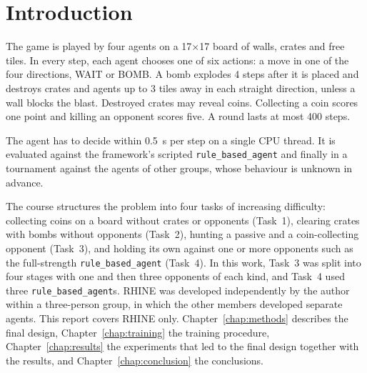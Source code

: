 \documentclass[11pt,a4paper]{report}
\begin{document}
	\clearpage
	
	\tableofcontents
	
	\clearpage
	
	\graphicspath{{figures/}}
	
	
	\chapter{Introduction}
	\label{chap:introduction}
	
	The game is played by four agents on a 17$\times$17 board of walls, crates and free tiles. In every step, each agent chooses one of six actions: a move in one of the four directions, WAIT or BOMB. A bomb explodes 4 steps after it is placed and destroys crates and agents up to 3 tiles away in each straight direction, unless a wall blocks the blast. Destroyed crates may reveal coins. Collecting a coin scores one point and killing an opponent scores five. A round lasts at most 400 steps.
	
	The agent has to decide within 0.5~s per step on a single CPU thread. It is evaluated against the framework's scripted \texttt{rule\_based\_agent} and finally in a tournament against the agents of other groups, whose behaviour is unknown in advance.
	
	The course structures the problem into four tasks of increasing difficulty: collecting coins on a board without crates or opponents (Task~1), clearing crates with bombs without opponents (Task~2), hunting a passive and a coin-collecting opponent (Task~3), and holding its own against one or more opponents such as the full-strength \texttt{rule\_based\_agent} (Task~4). In this work, Task~3 was split into four stages with one and then three opponents of each kind, and Task~4 used three \texttt{rule\_based\_agent}s. RHINE was developed independently by the author within a three-person group, in which the other members developed separate agents. This report covers RHINE only. Chapter~\ref{chap:methods} describes the final design, Chapter~\ref{chap:training} the training procedure, Chapter~\ref{chap:results} the experiments that led to the final design together with the results, and Chapter~\ref{chap:conclusion} the conclusions.
	
	
\end{document}
